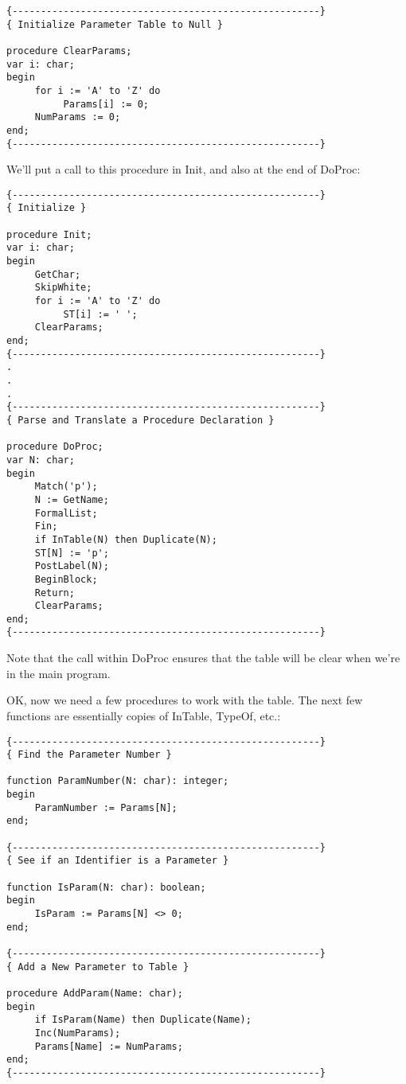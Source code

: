 \begin{verbatim}
{------------------------------------------------------}
{ Initialize Parameter Table to Null }

procedure ClearParams;
var i: char;
begin
     for i := 'A' to 'Z' do
          Params[i] := 0;
     NumParams := 0;
end;
{------------------------------------------------------}
\end{verbatim}

We'll put a call to this procedure in Init, and  also  at the end of DoProc:

\begin{verbatim}
{------------------------------------------------------}
{ Initialize }

procedure Init;
var i: char;
begin
     GetChar;
     SkipWhite;
     for i := 'A' to 'Z' do
          ST[i] := ' ';
     ClearParams;
end;
{------------------------------------------------------}
.
.
.
{------------------------------------------------------}
{ Parse and Translate a Procedure Declaration }

procedure DoProc;
var N: char;
begin
     Match('p');
     N := GetName;
     FormalList;
     Fin;
     if InTable(N) then Duplicate(N);
     ST[N] := 'p';
     PostLabel(N);
     BeginBlock;
     Return;
     ClearParams;
end;
{------------------------------------------------------}
\end{verbatim}

Note that the call  within  DoProc ensures that the table will be clear when we're in the main program.

OK, now  we  need  a  few procedures to work with the table. The next few functions are  essentially  copies  of  InTable, TypeOf, etc.:

\begin{verbatim}
{------------------------------------------------------}
{ Find the Parameter Number }

function ParamNumber(N: char): integer;
begin
     ParamNumber := Params[N];
end;

{------------------------------------------------------}
{ See if an Identifier is a Parameter }

function IsParam(N: char): boolean;
begin
     IsParam := Params[N] <> 0;
end;

{------------------------------------------------------}
{ Add a New Parameter to Table }

procedure AddParam(Name: char);
begin
     if IsParam(Name) then Duplicate(Name);
     Inc(NumParams);
     Params[Name] := NumParams;
end;
{------------------------------------------------------}
\end{verbatim}

